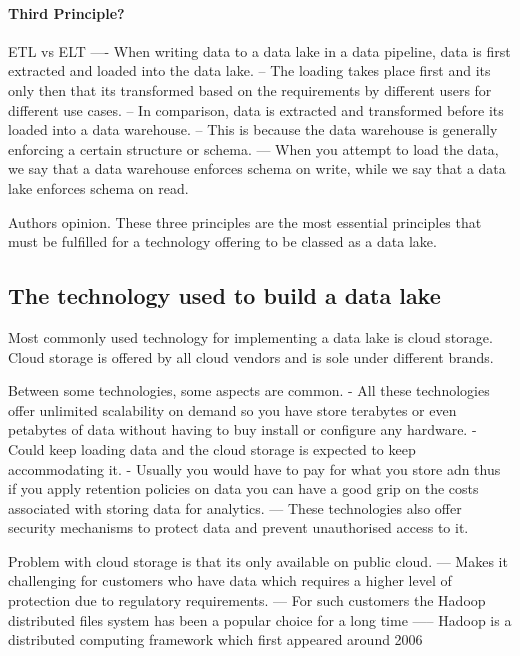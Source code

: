 \documentclass[a4paper, 11pt]{article}
\begin{document}
    \paragraph{Third Principle?}
    ETL vs ELT
    ---- When writing data to a data lake in a data pipeline, data is first extracted and loaded into the data lake.
    -- The loading takes place first and its only then that its transformed based on the requirements by different users for different use cases.
    -- In comparison, data is extracted and transformed before its loaded into a data warehouse.
    -- This is because the data warehouse is generally enforcing a certain structure or schema.
    --- When you attempt to load the data, we say that a data warehouse enforces schema on write, while we say that a data lake enforces schema on read.

    Authors opinion.
    These three principles are the most essential principles that must be fulfilled for a technology offering to be classed as a data lake.

    \subsection{The technology used to build a data lake}
    Most commonly used technology for implementing a data lake is cloud storage.
    Cloud storage is offered by all cloud vendors and is sole under different brands.

    Between some technologies, some aspects are common.
    - All these technologies offer unlimited scalability on demand so you have store terabytes or even petabytes of data without having to buy install or configure any hardware.
    - Could keep loading data and the cloud storage is expected to keep accommodating it.
    - Usually you would have to pay for what you store adn thus if you apply retention policies on data you can have a good grip on the costs associated with storing data for analytics.
    --- These technologies also offer security mechanisms to protect data and prevent unauthorised access to it.

    Problem with cloud storage is that its only available on public cloud.
    --- Makes it challenging for customers who have data which requires a higher level of protection due to regulatory requirements.
    --- For such customers the Hadoop distributed files system has been a popular choice for a long time
    ----- Hadoop is a distributed computing framework which first appeared around 2006
\end{document}
